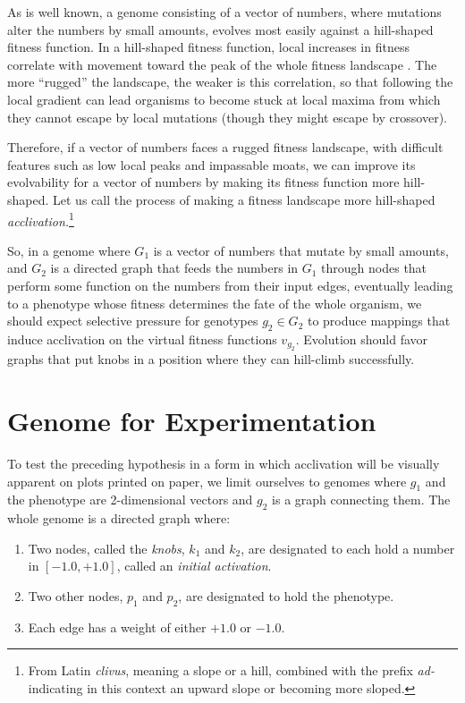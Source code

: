 \documentclass[letterpaper]{article}
\begin{document}
As is well known, a genome consisting of a vector of numbers, where mutations
alter the numbers by small amounts, evolves most easily against a hill-shaped
fitness function. In a hill-shaped fitness function, local increases in
fitness correlate with movement toward the peak of the whole fitness
landscape \citep{kauffman1987towards}. The more ``rugged'' the landscape, the
weaker is this correlation, so that following the local gradient can lead
organisms to become stuck at local maxima from which they cannot escape by
local mutations (though they might escape by crossover).

Therefore, if a vector of numbers faces a rugged fitness landscape, with
difficult features such as low local peaks and impassable moats, we can
improve its evolvability for a vector of numbers by making its fitness
function more hill-shaped. Let us call the process of making a fitness
landscape more hill-shaped \textit{acclivation.}\footnote{From
Latin \textit{clivus}, meaning a
slope or a hill, combined with the prefix \textit{ad-} indicating in this
context an upward slope or becoming more sloped.}

So, in a genome where $G_1$ is a vector of numbers that mutate by small
amounts, and $G_2$ is a directed graph that feeds the numbers in $G_1$ through
nodes that perform some function on the numbers from their input edges,
eventually leading to a phenotype whose fitness determines the fate of the
whole organism, we should expect selective pressure for genotypes $g_2 \in
G_2$ to produce mappings that induce acclivation on the virtual fitness
functions $v_{g_2}$. Evolution should favor graphs that put knobs in a
position where they can hill-climb successfully.

\section{Genome for Experimentation}

To test the preceding hypothesis in a form in which acclivation will be
visually apparent on plots printed on paper, we limit ourselves to genomes
where $g_1$ and the phenotype are 2-dimensional vectors and $g_2$ is a graph
connecting them.  The whole genome is a directed graph where:
\begin{enumerate}
   \item Two nodes, called the \textit{knobs}, $k_1$ and $k_2$, are designated
      to each hold a number in $[-1.0, +1.0]$, called an \textit{initial
      activation}.
   \item Two other nodes, $p_1$ and $p_2$, are designated to hold the
      phenotype.
   \item Each edge has a weight of either $+1.0$ or $-1.0$.
\end{enumerate}
\end{document}
